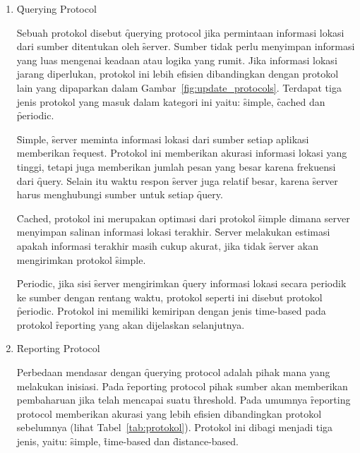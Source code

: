 \begin{enumerate}[noitemsep,nolistsep,leftmargin=0cm,itemindent=.5cm,listparindent=\parindent]
    \item \f{Querying Protocol}

        Sebuah protokol disebut \f{querying protocol} jika permintaan informasi lokasi
        dari sumber ditentukan oleh \f{server}. Sumber tidak perlu menyimpan informasi
        yang luas mengenai keadaan atau logika yang rumit. Jika informasi lokasi jarang
        diperlukan, protokol ini lebih efisien dibandingkan dengan protokol lain yang
        dipaparkan dalam Gambar~\ref{fig:update_protocols}. Terdapat tiga jenis protokol
        yang masuk dalam kategori ini yaitu: \f{simple}, \f{cached} dan \f{periodic}.

        \f{Simple}, \f{server} meminta informasi lokasi dari sumber setiap aplikasi memberikan
        \f{request}. Protokol ini memberikan akurasi informasi lokasi yang tinggi, tetapi 
        juga memberikan jumlah pesan yang besar karena frekuensi dari \f{query}. Selain
        itu waktu respon \f{server} juga relatif besar, karena \f{server} harus menghubungi
        sumber untuk setiap \f{query}.

        \f{Cached}, protokol ini merupakan optimasi dari protokol \f{simple} dimana
        server menyimpan salinan informasi lokasi terakhir. \f{Server} 
        melakukan estimasi apakah informasi terakhir masih cukup akurat, jika tidak
        \f{server} akan mengirimkan protokol \f{simple}. 

        \f{Periodic}, jika sisi \f{server} mengirimkan \f{query} informasi lokasi
        secara periodik ke sumber dengan rentang waktu, protokol seperti ini
        disebut protokol \f{periodic}. Protokol ini memiliki kemiripan dengan jenis
        time-based pada protokol \f{reporting} yang akan dijelaskan selanjutnya.

    \item \f{Reporting Protocol}

        Perbedaan mendasar dengan \f{querying protocol} adalah pihak mana yang melakukan
        inisiasi. Pada \f{reporting protocol} pihak sumber akan memberikan pembaharuan
        jika telah mencapai suatu \f{threshold}. Pada umumnya \f{reporting protocol}
        memberikan akurasi yang lebih efisien dibandingkan protokol sebelumnya (lihat
        Tabel~\ref{tab:protokol}). Protokol ini dibagi menjadi tiga jenis,
        yaitu: \f{simple}, \f{time-based} dan \f{distance-based}.


\end{enumerate}
